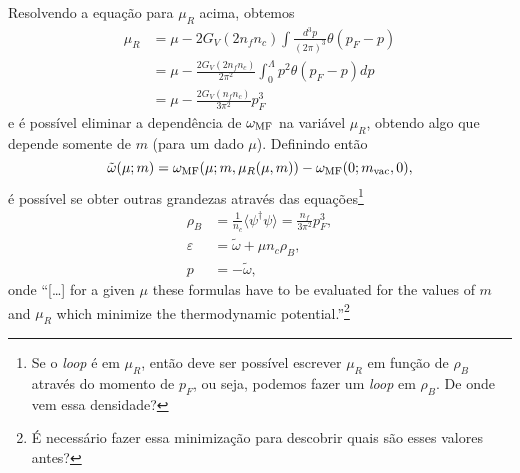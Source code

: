 Resolvendo a equação para $\mu_R$ acima, obtemos
\begin{align}
	\mu_R &= \mu - 2G_V(2n_fn_c)\int\frac{d^3p}{(2\pi)^3}\theta(p_F - p) \\
	&= \mu - \frac{2G_V(2n_fn_c)}{2\pi^2}\int_0^\Lambda p^2 \theta(p_F - p) dp \\
	&= \mu - \frac{2G_V(n_fn_c)}{3\pi^2}p_F^3
\end{align}
%
e é possível eliminar a dependência de $\omega_{\rm{MF}}$ na variável $\mu_R$, obtendo algo que depende somente de $m$ (para um dado $\mu$). Definindo então
\begin{equation}\label{Eq:Def_omega_tilde}
	\tilde{\omega}(\mu;m) = \omega_{\rm{MF}}(\mu; m, \mu_R(\mu,m)) - \omega_{\rm{MF}}(0; m_{\rm{vac}}, 0),
\end{equation}
%
é possível se obter outras grandezas através das equações\footnote{Se o \emph{loop} é em $\mu_R$, então deve ser possível escrever $\mu_R$ em função de $\rho_B$ através do momento de $p_F$, ou seja, podemos fazer um \emph{loop} em $\rho_B$. De onde vem essa densidade?}
\begin{align}
	\rho_B &= \frac{1}{n_c} \langle\psi^\dagger\psi\rangle = \frac{n_f}{3\pi^2}p_F^3, \label{Eq:Rel_Dens_Mom_Fermi_NJL}\\
	\varepsilon &= \tilde{\omega} + \mu n_c \rho_B, \label{Eq:Energia_omega_tilde}\\
	p &= - \tilde{\omega}, \label{Eq:Pressao_omega_tilde}
\end{align}
%
onde ``[\dots] for a given $\mu$ these formulas have to be evaluated for the values of $m$ and $\mu_R$ which minimize the thermodynamic potential.''\footnote{É necessário fazer essa minimização para descobrir quais são esses valores antes?}

